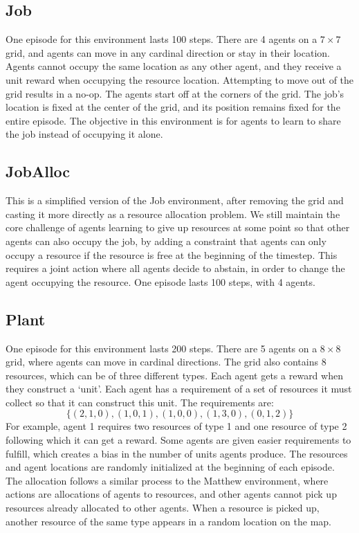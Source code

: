 \subsection{Job}
One episode for this environment lasts 100 steps. There are 4 agents on a $7\times 7$ grid, and agents can move in any cardinal direction or stay in their location. Agents cannot occupy the same location as any other agent, and they receive a unit reward when occupying the resource location. Attempting to move out of the grid results in a no-op. The agents start off at the corners of the grid. The job's location is fixed at the center of the grid, and its position remains fixed for the entire episode.
The objective in this environment is for agents to learn to share the job instead of occupying it alone.

\subsection{JobAlloc}
This is a simplified version of the Job environment, after removing the grid and casting it more directly as a resource allocation problem. We still maintain the core challenge of agents learning to give up resources at some point so that other agents can also occupy the job, by adding a constraint that agents can only occupy a resource if the resource is free at the beginning of the timestep. This requires a joint action where all agents decide to abstain, in order to change the agent occupying the resource. One episode lasts 100 steps, with 4 agents.

\subsection{Plant}
One episode for this environment lasts 200 steps. There are 5 agents on a $8 \times 8$ grid, where agents can move in cardinal directions.  The grid also contains 8 resources, which can be of three different types. Each agent gets a reward when they construct a `unit'. Each agent has a requirement of a set of resources it must collect  so that it can construct this unit. The requirements are: 
\[
\{ (2, 1, 0), (1, 0, 1), (1, 0, 0), (1, 3, 0), (0, 1, 2) \}
\]
For example, agent 1 requires two resources of type 1 and one resource of type 2 following which it can get a reward. Some agents are given easier requirements to fulfill, which creates a bias in the number of units agents produce. The resources and agent locations are randomly initialized at the beginning of each episode. The allocation follows a similar process to the Matthew environment, where actions are allocations of agents to resources, and other agents cannot pick up resources already allocated to other agents. When a resource is picked up, another resource of the same type appears in a random location on the map.

